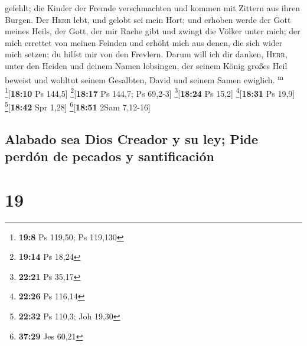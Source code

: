 gefehlt;  die Kinder der Fremde verschmachten und kommen
mit Zittern aus ihren Burgen.  Der \textsc{Herr} lebt,
und gelobt sei mein Hort; und erhoben werde der Gott meines Heils,
 der Gott, der mir Rache gibt und zwingt die Völker unter
mich;  der mich errettet von meinen Feinden und erhöht
mich aus denen, die sich wider mich setzen; du hilfst mir von den
Frevlern.  Darum will ich dir danken, \textsc{Herr},
unter den Heiden und deinem Namen lobsingen,  der seinem
König großes Heil beweist und wohltut seinem Gesalbten, David und seinem
Samen ewiglich. \textsuperscript{m} \footnote{\textbf{19:8} Ps 119,50;
  Ps 119,130}{[}\textbf{18:10} Ps 144,5{]} \footnote{\textbf{19:14} Ps
  18,24}{[}\textbf{18:17} Ps 144,7; Ps 69,2-3{]}
\footnote{\textbf{22:21} Ps 35,17}{[}\textbf{18:24} Ps 15,2{]}
\footnote{\textbf{22:26} Ps 116,14}{[}\textbf{18:31} Ps 19,9{]}
\footnote{\textbf{22:32} Ps 110,3; Joh 19,30}{[}\textbf{18:42} Spr
1,28{]} \footnote{\textbf{37:29} Jes 60,21}{[}\textbf{18:51} 2Sam
7,12-16{]}

\hypertarget{alabado-sea-dios-creador-y-su-ley-pide-perduxf3n-de-pecados-y-santificaciuxf3n}{%
\subsection{Alabado sea Dios Creador y su ley; Pide perdón de pecados y
santificación}\label{alabado-sea-dios-creador-y-su-ley-pide-perduxf3n-de-pecados-y-santificaciuxf3n}}

\hypertarget{section-18}{%
\section{19}\label{section-18}}

